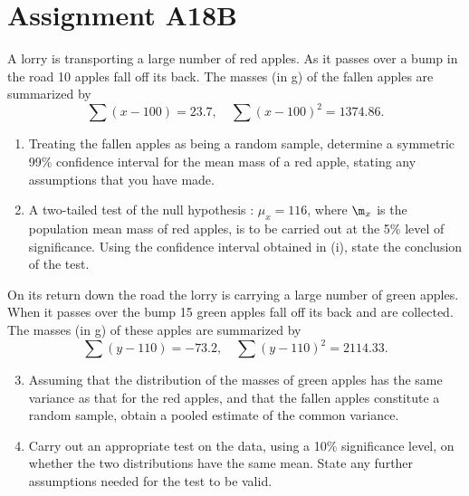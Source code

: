 \section{Assignment A18B}

\begin{problem}
    A lorry is transporting a large number of red apples. As it passes over a bump in the road 10 apples fall off its back. The masses (in g) of the fallen apples are summarized by \[\sum (x - 100) = 23.7, \quad \sum (x - 100)^2 = 1374.86.\]

    \begin{enumerate}
        \item Treating the fallen apples as being a random sample, determine a symmetric 99\% confidence interval for the mean mass of a red apple, stating any assumptions that you have made.
        \item A two-tailed test of the null hypothesis \nullhyp: $\mu_x = 116$, where $\m_x$ is the population mean mass of red apples, is to be carried out at the 5\% level of significance. Using the confidence interval obtained in (i), state the conclusion of the test. 
    \end{enumerate}

    On its return down the road the lorry is carrying a large number of green apples. When it passes over the bump 15 green apples fall off its back and are collected. The masses (in g) of these apples are summarized by \[\sum (y - 110) = -73.2, \quad \sum (y - 110)^2 = 2114.33.\]

    \begin{enumerate}
        \setcounter{enumi}{2}
        \item Assuming that the distribution of the masses of green apples has the same variance as that for the red apples, and that the fallen apples constitute a random sample, obtain a pooled estimate of the common variance.
        \item Carry out an appropriate test on the data, using a 10\% significance level, on whether the two distributions have the same mean. State any further assumptions needed for the test to be valid.
    \end{enumerate}
\end{problem}
